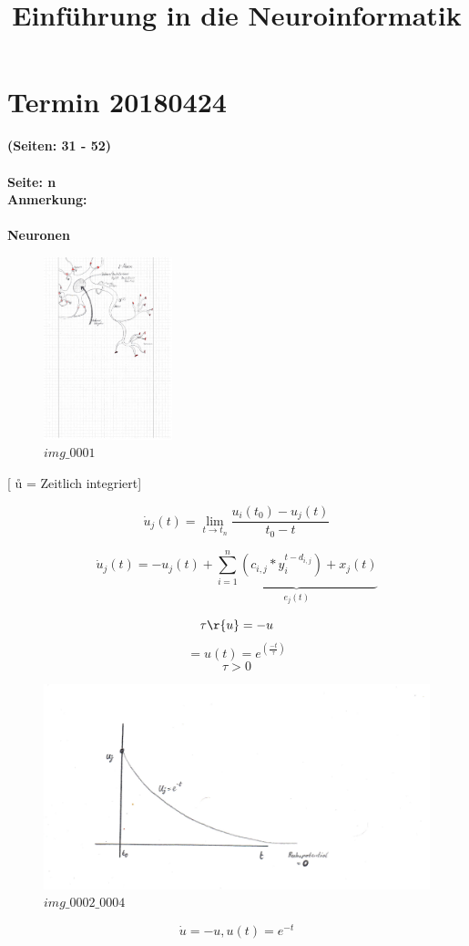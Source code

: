 \documentclass[10pt,a4paper]{article}
\title{Einführung in die Neuroinformatik}
\newcommand{\termin}[3]{\section{Termin #1} \bf(Seiten: #2 - #3)\\}
\newenvironment{merk}[1]{\noindent\makebox[\linewidth]{\rule{\textwidth}{0.2pt}}\\\bf Seite: #1\\ \bf Anmerkung: \\ \\}{}
\begin{document}
\maketitle

\termin{20180424}{31}{52}
 \begin{merk}{43}

n Neuronen

\begin{figure}[htbp]
    \begin{center}
        \includegraphics[trim=70 350 70 0, clip, width=.7\textwidth, height=200px]{img_0001.pdf}
    \caption{$img\_0001$}
    \label{img_0001}
    \end{center}
\end{figure}

[ \r{u} = Zeitlich integriert]\\
\begin{center}

$$ \dot u_j(t) = \lim_{t \to t_n} \frac{ u_i(t_0) - u_j(t) } { t_0 - t } $$

$$\dot u_j(t) =  - u_j(t) + \underbrace{ \sum_{i=1}^n ( c_{i,j} * y_i^{ t - d_{i,j} }) + x_j(t)}_{e_j(t)}$$

$$ \tau \r{u} = - u  $$
     $$   = u(t) = e^(\frac{-t}{\tau})$$
$$\tau > 0$$

\end{center}
\newpage
\begin{figure}[htbp]
    \begin{center}
        \includegraphics[width=.7\textwidth, keepaspectratio, page=3]{img_0002_0004.pdf}
    \caption{$ img\_0002\_0004$}
    \label{img_0002_0004}
    \end{center}
\end{figure}
\begin{center}
$$ \dot{u} = - u , u(t) = e^{-t}$$
\end{center}


\end{merk}
\end{document}
